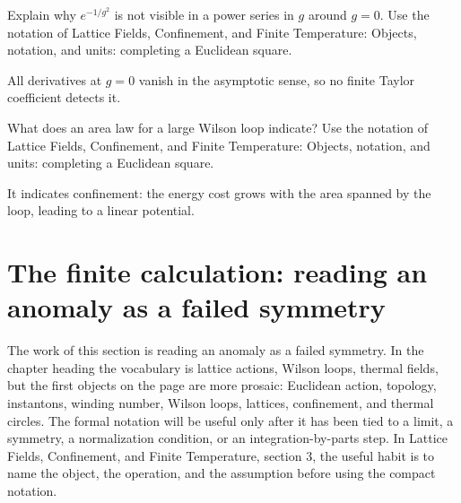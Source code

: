 \begin{exercise}
Explain why \(e^{-1/g^2}\) is not visible in a power series in \(g\) around \(g=0\).  Use the notation of Lattice Fields, Confinement, and Finite Temperature: Objects, notation, and units: completing a Euclidean square.
\begin{answer}
All derivatives at \(g=0\) vanish in the asymptotic sense, so no finite Taylor coefficient detects it.
\end{answer}
\end{exercise}

\begin{exercise}
What does an area law for a large Wilson loop indicate?  Use the notation of Lattice Fields, Confinement, and Finite Temperature: Objects, notation, and units: completing a Euclidean square.
\begin{answer}
It indicates confinement: the energy cost grows with the area spanned by the loop, leading to a linear potential.
\end{answer}
\end{exercise}



\section{The finite calculation: reading an anomaly as a failed symmetry}













The work of this section is reading an anomaly as a failed symmetry.  In the chapter heading the vocabulary is lattice actions, Wilson loops, thermal fields, but the first objects on the page are more prosaic: Euclidean action, topology, instantons, winding number, Wilson loops, lattices, confinement, and thermal circles.  The formal notation will be useful only after it has been tied to a limit, a symmetry, a normalization condition, or an integration-by-parts step.  In Lattice Fields, Confinement, and Finite Temperature, section 3, the useful habit is to name the object, the operation, and the assumption before using the compact notation.

